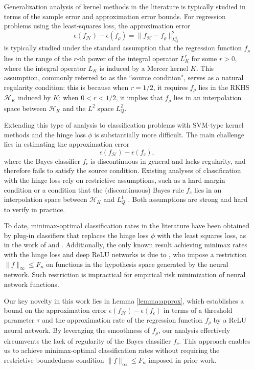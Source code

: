 \documentclass{article}
\begin{document}
Generalization analysis of kernel methods in the literature is typically studied in terms of the sample error and approximation error bounds. 
For regression problems using the least-squares loss, the approximation error $$\epsilon(f_{\mathcal H}) - \epsilon(f_\rho) =\|f_{\mathcal H} -f_\rho\|^2_{L^2_Q}$$
is typically studied under the standard assumption that the regression function $f_\rho$ lies in the range of the $r$-th power of the integral operator $L^r_K$ for some $r>0$, where the integral operator $L_K$ is induced by a Mercer kernel $K$. 
This assumption, commonly referred to as the ``source condition", serves as a natural regularity condition: this is because when $r=1/2$, it requires $f_\rho$ lies in the RKHS ${\mathcal H}_K$ induced by $K$; when $0<r<1/2$, it implies that $f_\rho$ lies in an interpolation space between ${\mathcal H}_K$ and the $L^2$ space $L^2_Q$. 

Extending this type of analysis to classification problems with SVM-type kernel methods and the hinge loss 
$\phi$ is substantially more difficult. The main challenge lies in estimating the approximation error $$\epsilon(f_{\mathcal H}) - \epsilon(f_c),$$ 
where the Bayes classifier $f_c$ is discontinuous in general and lacks regularity, and therefore fails to satisfy the source condition.
Existing analyses of classification with the hinge loss rely on restrictive assumptions, such as a hard margin condition \citep{shawe2004kernel} or a condition that the (discontinuous) Bayes rule $f_c$ lies in an interpolation space between ${\mathcal H}_K$ and $L^1_Q$ \citep{chen2004support, cucker2007learning}. Both assumptions are strong and hard to verify in practice. 

To date, minimax-optimal classification rates in the literature  have been obtained by plug-in classifiers that replaces the hinge loss $\phi$ with the least squares loss, as in the work of \citet{audibert2007fast} and \citet{smale2007learning}. 
Additionally, the only known result achieving minimax rates with the hinge loss and deep ReLU networks is due to \citet{kim2021fast}, who impose a restriction $\|f\|_\infty \leq F_n$ on functions in the hypothesis space generated by the neural network. Such restriction is impractical for empirical risk minimization of neural network functions.

Our key novelty in this work lies in Lemma \ref{lemma:approx}, which establishes a bound on the approximation error $\epsilon(f_{\mathcal H}) - \epsilon(f_c)$ in terms of a threshold parameter $\tau$ and the approximation rate of the regression function $f_\rho$ by a ReLU neural network. 
By leveraging the smoothness of $f_\rho$, our analysis effectively circumvents the lack of regularity of the Bayes classifier $f_c$. This approach enables us to achieve minimax-optimal classification rates without requiring the restrictive boundedness condition $\|f\|_\infty \leq F_n$
 imposed in prior work.
\end{document}
